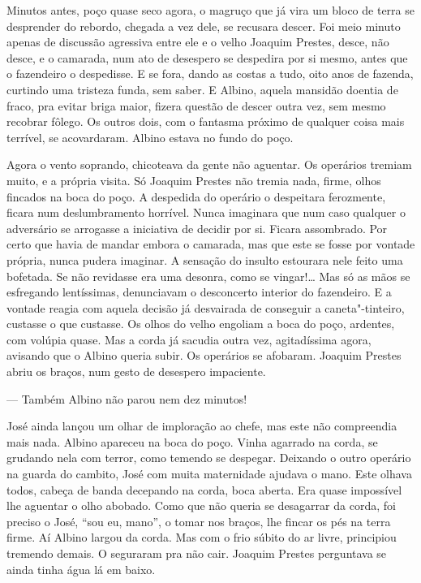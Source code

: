 Minutos antes, poço quase seco agora, o magruço que já vira um bloco de
terra se desprender do rebordo, chegada a vez dele, se recusara descer.
Foi meio minuto apenas de discussão agressiva entre ele e o velho
Joaquim Prestes, desce, não desce, e o camarada, num ato de desespero se
despedira por si mesmo, antes que o fazendeiro o despedisse. E se fora,
dando as costas a tudo, oito anos de fazenda, curtindo uma tristeza
funda, sem saber. E Albino, aquela mansidão doentia de fraco, pra evitar
briga maior, fizera questão de descer outra vez, sem mesmo recobrar
fôlego. Os outros dois, com o fantasma próximo de qualquer coisa mais
terrível, se acovardaram. Albino estava no fundo do poço.

Agora o vento soprando, chicoteava da gente não aguentar. Os operários
tremiam muito, e a própria visita. Só Joaquim Prestes não tremia nada,
firme, olhos fincados na boca do poço. A despedida do operário o
despeitara ferozmente, ficara num deslumbramento horrível. Nunca
imaginara que num caso qualquer o adversário se arrogasse a iniciativa
de decidir por si. Ficara assombrado. Por certo que havia de mandar
embora o camarada, mas que este se fosse por vontade própria, nunca
pudera imaginar. A sensação do insulto estourara nele feito uma
bofetada. Se não revidasse era uma desonra, como se vingar!\ldots{} Mas só as
mãos se esfregando lentíssimas, denunciavam o desconcerto interior do
fazendeiro. E a vontade reagia com aquela decisão já desvairada de
conseguir a caneta"-tinteiro, custasse o que custasse. Os olhos do velho
engoliam a boca do poço, ardentes, com volúpia quase. Mas a corda já
sacudia outra vez, agitadíssima agora, avisando que o Albino queria
subir. Os operários se afobaram. Joaquim Prestes abriu os braços, num
gesto de desespero impaciente.

--- Também Albino não parou nem dez minutos!

José ainda lançou um olhar de imploração ao chefe, mas este não
compreendia mais nada. Albino apareceu na boca do poço. Vinha agarrado
na corda, se grudando nela com terror, como temendo se despegar.
Deixando o outro operário na guarda do cambito, José com muita
maternidade ajudava o mano. Este olhava todos, cabeça de banda decepando
na corda, boca aberta. Era quase impossível lhe aguentar o olho abobado.
Como que não queria se desagarrar da corda, foi preciso o José, ``sou
eu, mano'', o tomar nos braços, lhe fincar os pés na terra firme. Aí
Albino largou da corda. Mas com o frio súbito do ar livre, principiou
tremendo demais. O seguraram pra não cair. Joaquim Prestes perguntava se
ainda tinha água lá em baixo.

